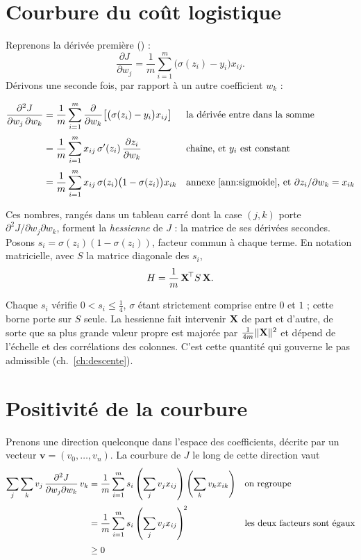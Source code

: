 \section{Courbure du coût logistique}

Reprenons la dérivée première () :
\[
  \frac{\partial J}{\partial w_j}
  =\frac{1}{m}\sum_{i=1}^{m}\bigl(\sigma(z_i)-y_i\bigr)x_{ij}.
\]
Dérivons une seconde fois, par rapport à un autre coefficient $w_k$ :

\begin{align}
  \frac{\partial^2 J}{\partial w_j\,\partial w_k}
  &= \frac{1}{m}\sum_{i=1}^{m}\frac{\partial}{\partial w_k}
     \bigl[\bigl(\sigma(z_i)-y_i\bigr)x_{ij}\bigr]
    &&\text{la dérivée entre dans la somme} \notag\\[2pt]
  &= \frac{1}{m}\sum_{i=1}^{m}x_{ij}\,\sigma'(z_i)\,
     \frac{\partial z_i}{\partial w_k}
    &&\text{chaîne, et } y_i \text{ est constant} \notag\\[2pt]
  &= \frac{1}{m}\sum_{i=1}^{m}x_{ij}\,\sigma(z_i)\bigl(1-\sigma(z_i)\bigr)x_{ik}
    &&\text{\annexeref{ann:sigmoide}, et } \partial z_i/\partial w_k=x_{ik}
    \label{eq:hess}
\end{align}

Ces nombres, rangés dans un tableau carré dont la case $(j,k)$ porte
$\partial^2 J/\partial w_j\partial w_k$, forment la \emph{hessienne} de $J$ : la
matrice de ses dérivées secondes. Posons $s_i=\sigma(z_i)(1-\sigma(z_i))$,
facteur commun à chaque terme. En notation matricielle, avec $S$ la matrice
diagonale des $s_i$,
\[
  H=\frac{1}{m}\,\mathbf{X}^{\!\top}S\,\mathbf{X} .
\]

Chaque $s_i$ vérifie $0<s_i\leq\frac14$, $\sigma$ étant strictement comprise
entre $0$ et $1$ ; cette borne porte sur $S$ seule. La hessienne fait intervenir
$\mathbf{X}$ de part et d'autre, de sorte que sa plus grande valeur propre est majorée
par $\tfrac{1}{4m}\|\mathbf{X}\|^2$ et dépend de l'échelle et des corrélations des
colonnes. C'est cette quantité qui gouverne le pas admissible
(ch.~\ref{ch:descente}).

\section{Positivité de la courbure}

Prenons une direction quelconque dans l'espace des coefficients, décrite par un
vecteur $\mathbf v=(v_0,\ldots,v_n)$. La courbure de $J$ le long de cette
direction vaut
\begin{align}
  \sum_{j}\sum_{k} v_j\,
  \frac{\partial^2 J}{\partial w_j\partial w_k}\,v_k
  &= \frac{1}{m}\sum_{i=1}^{m}s_i
     \left(\sum_j v_jx_{ij}\right)\left(\sum_k v_kx_{ik}\right)
    &&\text{on regroupe} \notag\\[2pt]
  &= \frac{1}{m}\sum_{i=1}^{m}s_i\left(\sum_j v_jx_{ij}\right)^{\!2}
    &&\text{les deux facteurs sont égaux} \notag\\[2pt]
  &\geq 0
\end{align}

